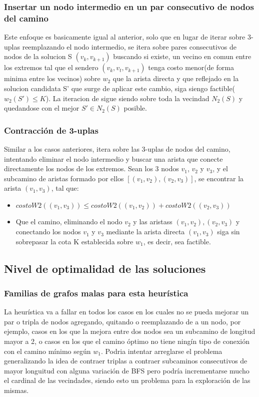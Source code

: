 \subsubsection{Insertar un nodo intermedio en un par consecutivo de nodos del camino}
Este enfoque es basicamente igual al anterior, solo que en lugar de iterar sobre 3-uplas reemplazando el nodo intermedio, se itera sobre pares consecutivos de nodos de la solucion S $(v_k, v_{k+1})$ buscando si existe, un vecino en comun entre los extremos tal que el sendero $(v_k, v_t, v_{k+1})$ tenga costo menor(de forma minima entre los vecinos) sobre $w_2$ que la arista directa y que reflejado en la solucion candidata S' que surge de aplicar este cambio, siga siengo factible($w_2(S') \leq K$). La iteracion de sigue siendo sobre toda la vecindad $N_2(S)$ y quedandose con el mejor $S' \in N_2(S)$ posible.


\subsubsection{Contracci\'on de 3-uplas}

Similar a los casos anteriores, itera sobre las 3-uplas de nodos del camino, intentando eliminar el nodo intermedio y buscar una arista que conecte directamente los nodos de los extremos. Sean los 3 nodos $v_1$, $v_2$ y $v_3$, y el subcamino de aristas formado por ellos $[ (v_1, v_2), (v_2, v_3)]$, se encontrar la arista $(v_1, v_3)$, tal que:

\begin{itemize}
	\item $costoW2((v_1, v_3)) \leq costoW2((v_1, v_2)) + costoW2((v_2, v_3))$
	\item Que el camino, eliminando el nodo $v_2$ y las aristass $(v_1, v_2), (v_2, v_3)$ y conectando los nodos $v_1$ y $v_3$ mediante la arista directa $(v_1, v_3)$ siga sin sobrepasar la cota K establecida sobre $w_1$, es decir, sea factible.
\end{itemize}

\subsection{Nivel de optimalidad de las soluciones}
\subsubsection{Familias de grafos malas para esta heur\'istica}

La heur\'istica va a fallar en todos los casos en los cuales no se pueda mejorar un par o tripla de nodos agregando, quitando o reemplazando de a un nodo, por ejemplo, casos en los que la mejora entre dos nodos sea un subcamino de longitud mayor a 2, o casos en los que el camino \'optimo no tiene ning\'in tipo de conexi\'on con el camino m\'inimo seg\'un $w_1$. Podria intentar arreglarse el problema generalizando la idea de contraer triplas a contraer subcaminos consecutivos de mayor longuitud con alguna variaci\'on de BFS pero podr\'ia incrementarse mucho el cardinal de las vecindades, siendo esto un problema para la exploraci\'on de las mismas.

